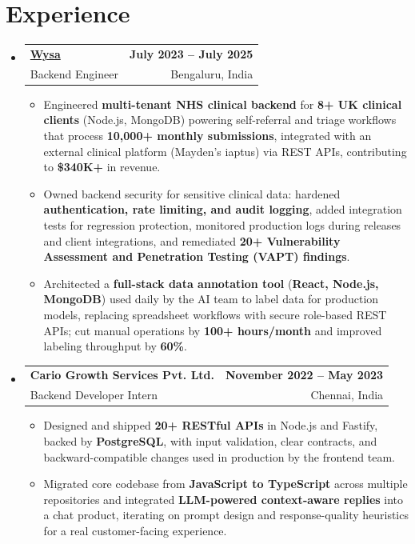 \documentclass[letterpaper,10pt]{article}
\makeatletter
\newcommand{\resumeItem}[1]{
  \item\small{#1\vspace{-1pt}}
}
\newcommand{\resumeSubheading}[4]{
  \vspace{1pt}\item
    \begin{tabular*}{0.985\textwidth}[t]{l@{\extracolsep{\fill}}r}
      \textbf{#1} & \textbf{\small #2} \\
      {\small\color{ResumeSlate} #3} & {\small\color{ResumeSlate} #4} \\
    \end{tabular*}\vspace{-6pt}
}
\newcommand{\resumeSubHeadingListStart}{\begin{itemize}[leftmargin=0.0in, label={}, itemsep=2pt, topsep=2pt]}
\newcommand{\resumeSubHeadingListEnd}{\end{itemize}}
\newcommand{\resumeItemListStart}{\begin{itemize}[leftmargin=0.18in, itemsep=2pt, topsep=1pt]}
\newcommand{\resumeItemListEnd}{\end{itemize}\vspace{-4pt}}
\makeatother
\begin{document}
\section{Experience}
\resumeSubHeadingListStart
  \resumeSubheading
    {\href{https://www.wysa.io}{Wysa}}{July 2023 -- July 2025}
    {Backend Engineer}{Bengaluru, India}
    \resumeItemListStart
      \resumeItem{Engineered \textbf{multi-tenant NHS clinical backend} for \textbf{8+ UK clinical clients} (Node.js, MongoDB) powering self-referral and triage workflows that process \textbf{10{,}000+ monthly submissions}, integrated with an external clinical platform (Mayden's iaptus) via REST APIs, contributing to \textbf{\$340K+} in revenue.}
      \resumeItem{Owned backend security for sensitive clinical data: hardened \textbf{authentication, rate limiting, and audit logging}, added integration tests for regression protection, monitored production logs during releases and client integrations, and remediated \textbf{20+ Vulnerability Assessment and Penetration Testing (VAPT) findings}.}
      \resumeItem{Architected a \textbf{full-stack data annotation tool} (\textbf{React, Node.js, MongoDB}) used daily by the AI team to label data for production models, replacing spreadsheet workflows with secure role-based REST APIs; cut manual operations by \textbf{100+ hours/month} and improved labeling throughput by \textbf{60\%}.}
    \resumeItemListEnd
  \resumeSubheading
    {Cario Growth Services Pvt. Ltd.}{November 2022 -- May 2023}
    {Backend Developer Intern}{Chennai, India}
    \resumeItemListStart
      \resumeItem{Designed and shipped \textbf{20+ RESTful APIs} in Node.js and Fastify, backed by \textbf{PostgreSQL}, with input validation, clear contracts, and backward-compatible changes used in production by the frontend team.}
      \resumeItem{Migrated core codebase from \textbf{JavaScript to TypeScript} across multiple repositories and integrated \textbf{LLM-powered context-aware replies} into a chat product, iterating on prompt design and response-quality heuristics for a real customer-facing experience.}
    \resumeItemListEnd
\resumeSubHeadingListEnd
\vspace{-4pt}
\end{document}
